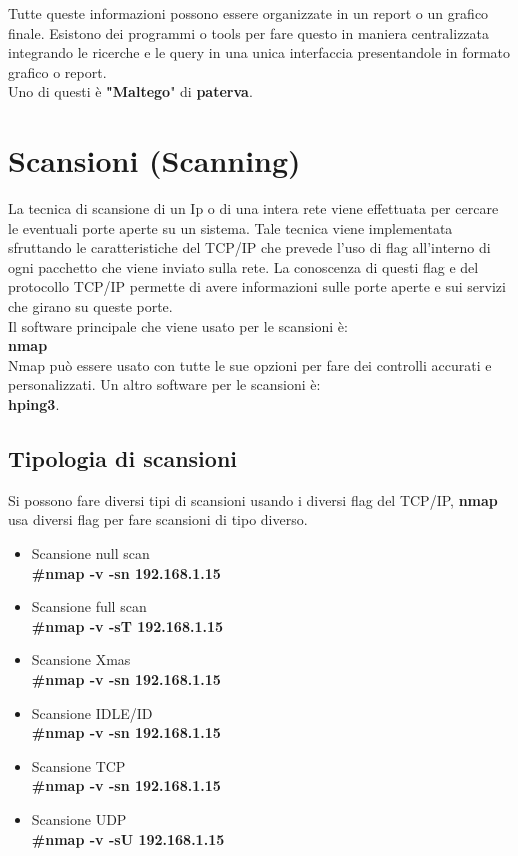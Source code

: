 \documentclass[a4paper,12pt]{article}
\begin{document}
Tutte queste informazioni possono essere organizzate in un report o un grafico finale. Esistono dei programmi o tools  per fare questo in maniera centralizzata integrando le ricerche e le query in una unica interfaccia presentandole in formato grafico o report.
\\ Uno di questi è \textbf{"Maltego}"\cite{maltego} di \textbf{paterva}\cite{paterva}. 

\section{ Scansioni (Scanning) }

La tecnica di scansione di un Ip o di una intera rete viene effettuata per cercare le eventuali porte aperte su un sistema. Tale tecnica viene implementata sfruttando le caratteristiche del TCP/IP che prevede l'uso di flag all'interno di ogni pacchetto che viene inviato sulla rete. La conoscenza di questi flag e del protocollo TCP/IP permette di avere informazioni sulle porte aperte e sui servizi che girano su queste porte. \\
Il software principale che viene usato per le scansioni è: \\
\textbf{nmap}\cite{nmap} \\
Nmap può essere usato con tutte le sue opzioni per fare dei controlli accurati e personalizzati.
Un altro software per le scansioni è: \\
\textbf{ hping3}\cite{hping3}.

\subsection{Tipologia di scansioni}
Si possono fare diversi tipi di scansioni usando i diversi flag del TCP/IP, \textbf{nmap}\cite{nmap} \\ usa diversi flag per fare scansioni di tipo diverso.
\begin{itemize}
    \item Scansione null scan \\
      \textbf{ \#nmap  -v -sn 192.168.1.15}
    \item Scansione full scan \\
        \textbf{ \#nmap  -v -sT 192.168.1.15}
    \item Scansione Xmas \\
        \textbf{ \#nmap  -v -sn 192.168.1.15}
    \item Scansione IDLE/ID \\
        \textbf{ \#nmap  -v -sn 192.168.1.15}
    \item Scansione TCP \\
        \textbf{ \#nmap  -v -sn 192.168.1.15}
    \item Scansione UDP \\
        \textbf{ \#nmap  -v -sU 192.168.1.15}
\end{itemize}
\end{document}
